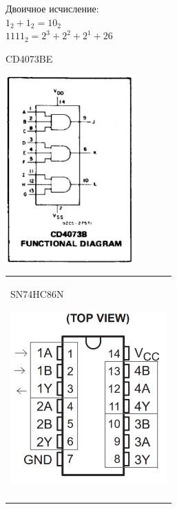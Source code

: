 \documentclass[a4paper,12pt]{article} %
\begin{document}
\large{
Двоичное исчисление:\\
$1_2 + 1_2 = 10_2 $\\
$1111_2 = 2^3 + 2^2 + 2^1 + 26 $




\begin{minipage}{0.45\textwidth}

\begin{center}


 \Large { CD4073BE}

\includegraphics[width=5cm]{and.png}\\
\end{center}
\end{minipage}%
\hfill
\begin{minipage}{0.45\textwidth}
\begin{tabular}{|p{\textwidth}}

\begin{center}
 \LARGE {SN74HC86N}
\end{center}
\includegraphics[width=6cm]{xor.png}
\begin{center}
\LARGE{$Y = A \oplus B $} \\
\vspace{0.5cm}


\end{center}
\end{tabular}
\end{minipage}}
\end{document}

